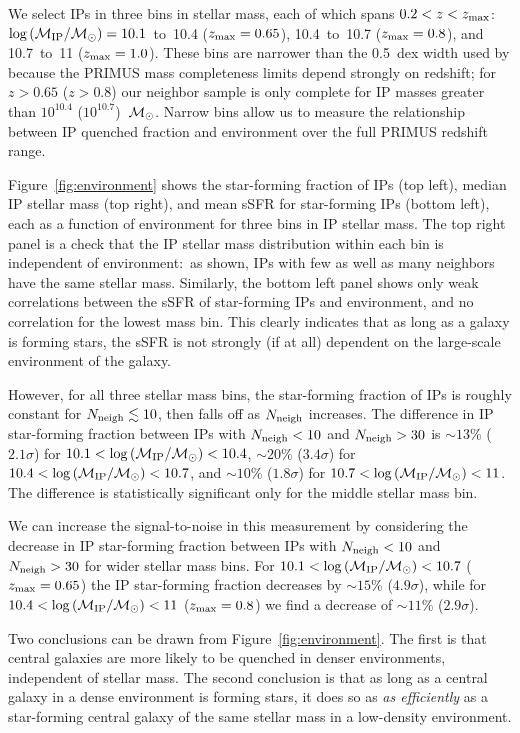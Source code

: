 We select IPs in three bins in stellar mass, each of which spans ${0.2<z<z_{\text{max}}}$:~${\log\,(\mIP/\msun)=10.1}$~to~10.4 (${z_{\text{max}}=0.65}$), 10.4~to~10.7 (${z_{\text{max}}=0.8}$), and 10.7~to~11 (${z_{\text{max}}=1.0}$).
These bins are narrower than the 0.5~dex width used by \citePB because the PRIMUS mass completeness limits depend strongly on redshift; for $z>0.65$ {($z>0.8$)} our neighbor sample is only complete for IP masses greater than $10^{10.4}$ ($10^{10.7}$)~$\msun$.
Narrow bins allow us to measure the relationship between IP quenched fraction and environment over the full PRIMUS redshift range.

Figure~\ref{fig:environment} shows the star-forming fraction of IPs (top left), median IP stellar mass (top right), and mean sSFR for star-forming IPs (bottom left), each as a function of environment for three bins in IP stellar mass.
The top right panel is a check that the IP stellar mass distribution within each bin is independent of environment:~as shown, IPs with few as well as many neighbors have the same stellar mass.
Similarly, the bottom left panel shows only weak correlations between the sSFR of star-forming IPs and environment, and no correlation for the lowest mass bin.  This clearly indicates that as long as a galaxy is forming stars, the sSFR is not strongly (if at all) dependent on the large-scale environment of the galaxy.

However, for all three stellar mass bins, the star-forming fraction of IPs is roughly constant for ${\Nneigh\lesssim10}$, then falls off as $\Nneigh$ increases.
The difference in IP star-forming fraction between IPs with ${\Nneigh<10}$ and ${\Nneigh>30}$ is
$\sim13$\% ($2.1\sigma$) for ${10.1<\log\,(\mIP/\msun)<10.4}$,
$\sim20$\% ($3.4\sigma$) for ${10.4<\log\,(\mIP/\msun)<10.7}$, and
$\sim10$\% ($1.8\sigma$) for ${10.7<\log\,(\mIP/\msun)<11}$.
The difference is statistically significant only for the middle stellar mass bin.

We can increase the signal-to-noise in this measurement by considering the decrease in IP star-forming fraction between IPs with
${\Nneigh<10}$ and ${\Nneigh>30}$ for wider stellar mass bins. 
For ${10.1<\log\,(\mIP/\msun)<10.7}$ (${z_{\text{max}}=0.65}$) the IP star-forming fraction decreases by $\sim15$\% ($4.9\sigma$), 
while for ${10.4<\log\,(\mIP/\msun)<11}$ (${z_{\text{max}}=0.8}$) we find a decrease of $\sim11$\% ($2.9\sigma$).

Two conclusions can be drawn from Figure~\ref{fig:environment}.
The first is that central galaxies are more likely to be quenched in denser environments, independent of stellar mass.
The second conclusion is that as long as a central galaxy in a dense environment is forming stars, it does so as \emph{as efficiently} as a
star-forming central galaxy of the same stellar mass in a low-density environment.

